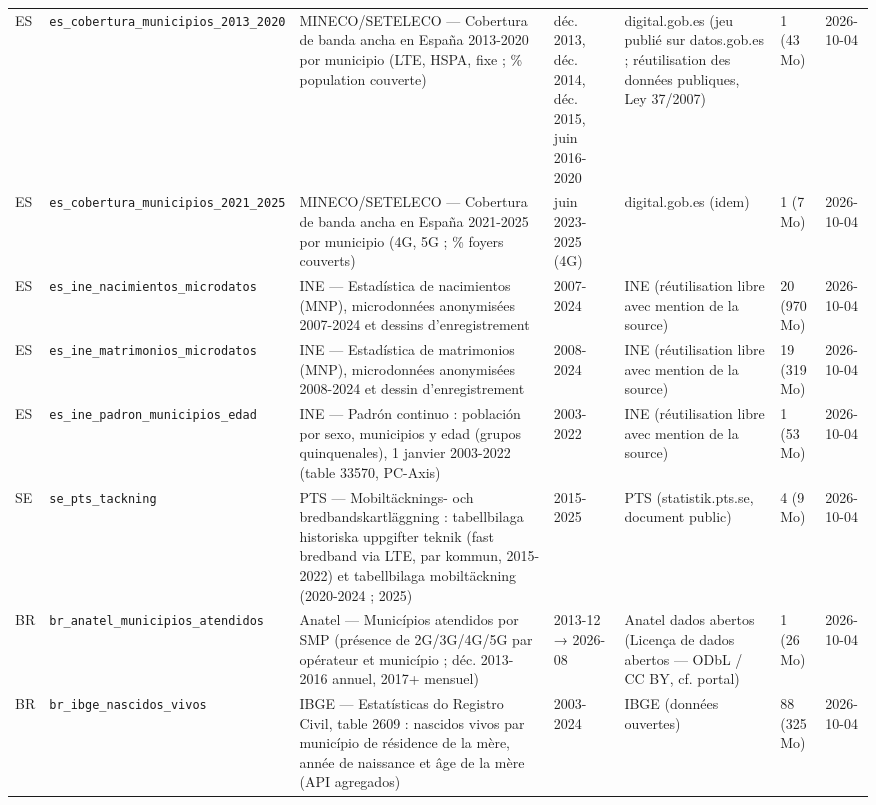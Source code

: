 \begin{longtable}{lp{2.2cm}p{3.9cm}p{2.1cm}p{1.9cm}p{1.4cm}p{1.6cm}}
ES & \texttt{es\_\allowbreak{}cobertura\_\allowbreak{}municipios\_\allowbreak{}2013\_\allowbreak{}2020} & MINECO/SETELECO — Cobertura de banda ancha en España 2013-2020 por municipio (LTE, HSPA, fixe ; \% population couverte) & déc. 2013, déc. 2014, déc. 2015, juin 2016-2020 & digital.gob.es (jeu publié sur datos.gob.es ; réutilisation des données publiques, Ley 37/2007) & 1 (43 Mo) & 2026-10-04 \\
ES & \texttt{es\_\allowbreak{}cobertura\_\allowbreak{}municipios\_\allowbreak{}2021\_\allowbreak{}2025} & MINECO/SETELECO — Cobertura de banda ancha en España 2021-2025 por municipio (4G, 5G ; \% foyers couverts) & juin 2023-2025 (4G) & digital.gob.es (idem) & 1 (7 Mo) & 2026-10-04 \\
ES & \texttt{es\_\allowbreak{}ine\_\allowbreak{}nacimientos\_\allowbreak{}microdatos} & INE — Estadística de nacimientos (MNP), microdonnées anonymisées 2007-2024 et dessins d'enregistrement & 2007-2024 & INE (réutilisation libre avec mention de la source) & 20 (970 Mo) & 2026-10-04 \\
ES & \texttt{es\_\allowbreak{}ine\_\allowbreak{}matrimonios\_\allowbreak{}microdatos} & INE — Estadística de matrimonios (MNP), microdonnées anonymisées 2008-2024 et dessin d'enregistrement & 2008-2024 & INE (réutilisation libre avec mention de la source) & 19 (319 Mo) & 2026-10-04 \\
ES & \texttt{es\_\allowbreak{}ine\_\allowbreak{}padron\_\allowbreak{}municipios\_\allowbreak{}edad} & INE — Padrón continuo : población por sexo, municipios y edad (grupos quinquenales), 1 janvier 2003-2022 (table 33570, PC-Axis) & 2003-2022 & INE (réutilisation libre avec mention de la source) & 1 (53 Mo) & 2026-10-04 \\
SE & \texttt{se\_\allowbreak{}pts\_\allowbreak{}tackning} & PTS — Mobiltäcknings- och bredbandskartläggning : tabellbilaga historiska uppgifter teknik (fast bredband via LTE, par kommun, 2015-2022) et tabellbilaga mobiltäckning (2020-2024 ; 2025) & 2015-2025 & PTS (statistik.pts.se, document public) & 4 (9 Mo) & 2026-10-04 \\
BR & \texttt{br\_\allowbreak{}anatel\_\allowbreak{}municipios\_\allowbreak{}atendidos} & Anatel — Municípios atendidos por SMP (présence de 2G/3G/4G/5G par opérateur et município ; déc. 2013-2016 annuel, 2017+ mensuel) & 2013-12 → 2026-08 & Anatel dados abertos (Licença de dados abertos — ODbL / CC BY, cf. portal) & 1 (26 Mo) & 2026-10-04 \\
BR & \texttt{br\_\allowbreak{}ibge\_\allowbreak{}nascidos\_\allowbreak{}vivos} & IBGE — Estatísticas do Registro Civil, table 2609 : nascidos vivos par município de résidence de la mère, année de naissance et âge de la mère (API agregados) & 2003-2024 & IBGE (données ouvertes) & 88 (325 Mo) & 2026-10-04 \\

\end{longtable}
